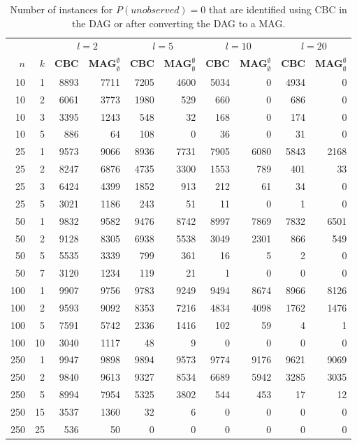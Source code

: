 \begin{table}
  \begin{center}
  \scriptsize
  \begin{tabular}{|rr | rr| rr| rr| rr|}
  \hline
   &&\multicolumn{2}{c|}{$l=2$} &\multicolumn{2}{c|}{$l=5$} &\multicolumn{2}{c|}{$l=10$} &\multicolumn{2}{c|}{$l=20$}\\
   \bfseries $n$ & \bfseries $k$
& \bfseries CBC & \bfseries MAG$^\emptyset_\emptyset$
& \bfseries CBC & \bfseries MAG$^\emptyset_\emptyset$
& \bfseries CBC & \bfseries MAG$^\emptyset_\emptyset$
& \bfseries CBC & \bfseries MAG$^\emptyset_\emptyset$
\\\hline
10&1&
8893&7711&7205&4600&5034&0&4934&0\\
10&2&
6061&3773&1980&529&660&0&686&0\\
10&3&
3395&1243&548&32&168&0&174&0\\
10&5&
886&64&108&0&36&0&31&0\\
\hline
25&1&
9573&9066&8936&7731&7905&6080&5843&2168\\
25&2&
8247&6876&4735&3300&1553&789&401&33\\
25&3&
6424&4399&1852&913&212&61&34&0\\
25&5&
3021&1186&243&51&11&0&1&0\\
\hline
50&1&
9832&9582&9476&8742&8997&7869&7832&6501\\
50&2&
9128&8305&6938&5538&3049&2301&866&549\\
50&5&
5535&3339&799&361&16&5&2&0\\
50&7&
3120&1234&119&21&1&0&0&0\\
\hline
100&1&
9907&9756&9783&9249&9494&8674&8966&8126\\
100&2&
9593&9092&8353&7216&4834&4098&1762&1476\\
100&5&
7591&5742&2336&1416&102&59&4&1\\
100&10&
3040&1117&48&9&0&0&0&0\\
\hline
250&1&
9947&9898&9894&9573&9774&9176&9621&9069\\
250&2&
9840&9613&9327&8534&6689&5942&3285&3035\\
250&5&
8994&7954&5325&3802&544&453&17&12\\
250&15&
3537&1360&32&6&0&0&0&0\\
250&25&
536&50&0&0&0&0&0&0\\
\hline\end{tabular}
  \end{center}\vspace*{-3mm}
  \caption{Number of instances for $P(\textit{unobserved}) = 0$ that are identified using CBC in the DAG or after converting the DAG to a MAG.}\label{table:mags:0}
  \end{table}
